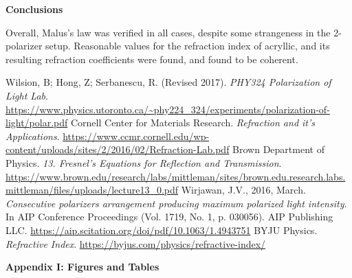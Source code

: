 \documentclass[11pt]{article}
\begin{document}
\begin{multicols}{2}
    \vspace{10pt}

     \selectfont \textbf{Conclusions}


     \selectfont Overall, Malus's law was verified in all cases, despite some strangeness in the 2-polarizer setup. Reasonable values for the refraction index of acryllic, and its resulting refraction coefficients were found, and found to be coherent.


\end{multicols}

    \vspace{10pt}
     
     \selectfont

    \begin{thebibliography}{} \selectfont
         Wilsion, B; Hong, Z; Serbanescu, R. (Revised 2017). \textit{PHY324 Polarization of Light Lab}. \color{blue}\url{https://www.physics.utoronto.ca/~phy224_324/experiments/polarization-of-light/polar.pdf}\color{black}
         Cornell Center for Materials Research. \textit{Refraction and it's Applications}. \color{blue}\url{https://www.ccmr.cornell.edu/wp-content/uploads/sites/2/2016/02/Refraction-Lab.pdf}\color{black}
         Brown Department of Physics. \textit{13. Fresnel's Equations for Reflection and Transmission}. \color{blue}\url{https://www.brown.edu/research/labs/mittleman/sites/brown.edu.research.labs.mittleman/files/uploads/lecture13_0.pdf}\color{black}
         Wirjawan, J.V., 2016, March. \textit{Consecutive polarizers arrangement producing maximum polarized light intensity}. In AIP Conference Proceedings (Vol. 1719, No. 1, p. 030056). AIP Publishing LLC. \color{blue}\url{https://aip.scitation.org/doi/pdf/10.1063/1.4943751}\color{black}
         BYJU Physics. \textit{Refractive Index}. \color{blue}\url{https://byjus.com/physics/refractive-index/}\color{black}
    \end{thebibliography}




    \pagebreak 



     \selectfont \textbf{Appendix I: Figures and Tables}
    
     \selectfont
\end{document}
